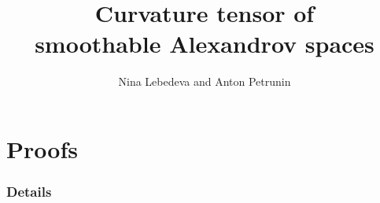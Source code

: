 \documentclass[a4paper,10pt]{article}
\begin{document}
\title{Curvature tensor of\\ smoothable Alexandrov spaces}
\date{}
\author{Nina Lebedeva and Anton Petrunin} 
\maketitle



\tableofcontents




\part*{Proofs}











%

%
%
%

\section{Details}



%

{\sloppy
\printbibliography[heading=bibintoc]
\fussy
}
\end{document}
